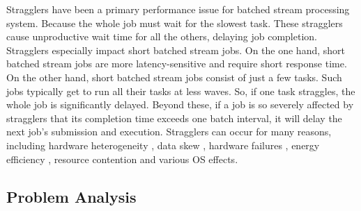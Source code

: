 \documentclass[10pt,conference,compsocconf,letterpaper]{IEEEtran}
\begin{document}
  Stragglers have been a primary performance issue for batched stream processing system. Because the whole job must wait for the slowest task. These stragglers cause unproductive wait time for all the others, delaying job completion. Stragglers especially impact short batched stream jobs. On the one hand, short batched stream jobs are more latency-sensitive and require short response time. On the other hand, short batched stream jobs consist of just a few tasks. Such jobs typically get to run all their tasks at less waves. So, if one task straggles, the whole job is significantly delayed. Beyond these, if a job is so severely affected by stragglers that its completion time exceeds one batch interval, it will delay the next job's submission and execution. Stragglers can occur for many reasons, including hardware heterogeneity \cite{Reiss2012}, data skew \cite{Kwon2012}, hardware failures \cite{Ananthanarayanan2010}, energy efficiency \cite{Cheng2015}, resource contention and various OS effects.

\subsection{Problem Analysis}
\end{document}
